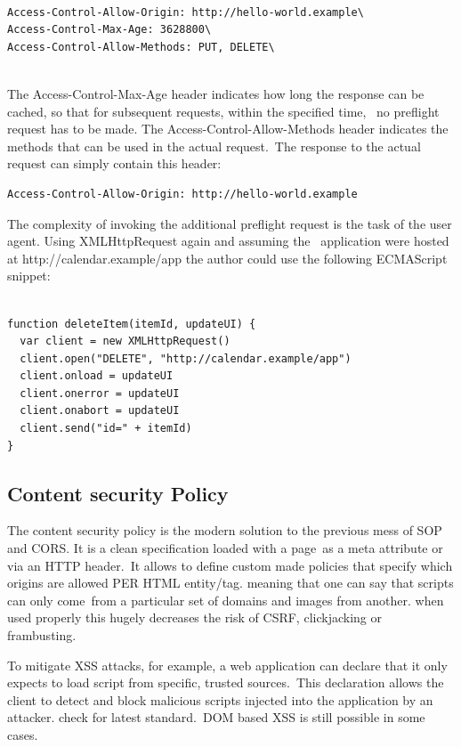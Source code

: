 \begin{verbatim}

Access-Control-Allow-Origin: http://hello-world.example\
Access-Control-Max-Age: 3628800\
Access-Control-Allow-Methods: PUT, DELETE\
 
\end{verbatim}

The Access-Control-Max-Age header indicates how long the response can be cached, so that for subsequent requests, within the specified time, \
no preflight request has to be made. The Access-Control-Allow-Methods header indicates the methods that can be used in the actual request.\
The response to the actual request can simply contain this header:\\

\begin{verbatim}
Access-Control-Allow-Origin: http://hello-world.example 
\end{verbatim}

The complexity of invoking the additional preflight request is the task of the user agent. Using XMLHttpRequest again and assuming the \
application were hosted at http://calendar.example/app the author could use the following ECMAScript snippet:\\

\begin{verbatim}

function deleteItem(itemId, updateUI) {
  var client = new XMLHttpRequest()
  client.open("DELETE", "http://calendar.example/app")
  client.onload = updateUI
  client.onerror = updateUI
  client.onabort = updateUI
  client.send("id=" + itemId)
} 
\end{verbatim}

\subsection{Content security Policy}
\label{label:CSP}

The content security policy  is the modern solution to the previous mess of SOP and CORS. It is a clean specification loaded with a page\
as a meta attribute or via an HTTP header.\
It allows to define custom made policies that specify which origins are allowed PER HTML entity/tag. meaning that one can say that scripts can only come\
from a particular set of domains and images from another. when used properly this hugely decreases the risk of CSRF, clickjacking or frambusting.\

To mitigate XSS attacks, for example, a web application can declare that it only expects to load script from specific, trusted sources.\
This declaration allows the client to detect and block malicious scripts injected into the application by an attacker. check \cite{csp} for latest standard.\
DOM based XSS is still possible in some cases.\\


